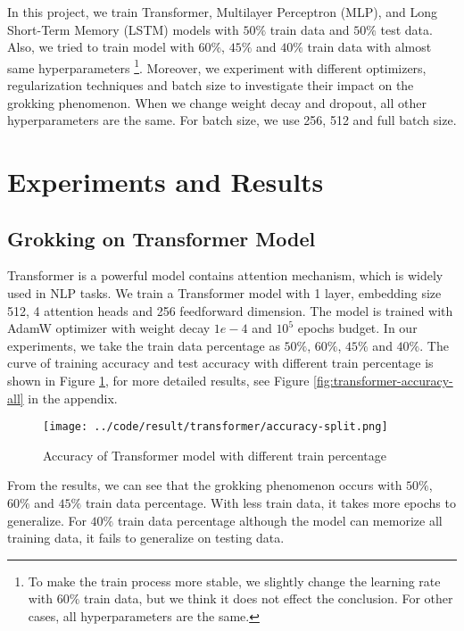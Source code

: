 \documentclass{article}
\begin{document}
In this project, we train Transformer, Multilayer Perceptron (MLP), and Long Short-Term Memory (LSTM) models with $50\%$ train data and $50\%$ test data. Also, we tried to train model with $60\%$, $45\%$ and $40\%$ train data with almost same hyperparameters \footnote{To make the train process more stable, we slightly change the learning rate with $60\%$ train data, but we think it does not effect the conclusion. For other cases, all hyperparameters are the same.}. Moreover, we experiment with different optimizers, regularization techniques and batch size to investigate their impact on the grokking phenomenon. When we change weight decay and dropout, all other hyperparameters are the same. For batch size, we use 256, 512 and full batch size.

\section{Experiments and Results}

\subsection{Grokking on Transformer Model}

Transformer is a powerful model contains attention mechanism, which is widely used in NLP tasks. We train a Transformer model with 1 layer, embedding size 512, 4 attention heads and 256 feedforward dimension. The model is trained with AdamW optimizer with weight decay $1e-4$ and $10^5$ epochs budget. In our experiments, we take the train data percentage as $50\%$, $60\%$, $45\%$ and $40\%$. The curve of training accuracy and test accuracy with different train percentage is shown in Figure \ref{fig:transformer-accuracy}, for more detailed results, see Figure \ref{fig:transformer-accuracy-all} in the appendix.

\begin{figure}[ht]
    \centering
    \texttt{[image: ../code/result/transformer/accuracy-split.png]}
    \caption{Accuracy of Transformer model with different train percentage}
    \label{fig:transformer-accuracy}
\end{figure}

From the results, we can see that the grokking phenomenon occurs with $50\%$, $60\%$ and $45\%$ train data percentage. With less train data, it takes more epochs to generalize. For $40\%$ train data percentage although the model can memorize all training data, it fails to generalize on testing data.
\end{document}
